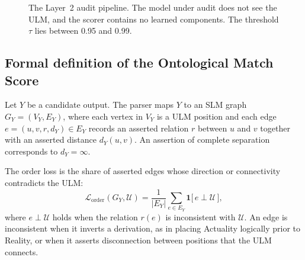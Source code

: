 \documentclass[twocolumn]{ulpaper}
\newcommand{\ULM}{\mathcal{U}}
\newcommand{\OMS}{\operatorname{OMS}}
\newcommand{\Lord}{\mathcal{L}_{\text{order}}}
\begin{document}
\begin{figure}[t]
\centering
{}
\caption{The Layer~2 audit pipeline. The model under audit does not see the ULM, and the scorer contains no learned components. The threshold $\tau$ lies between 0.95 and 0.99.}
\label{fig:pipeline}
\end{figure}

\subsection{Formal definition of the Ontological Match Score}

Let $Y$ be a candidate output. The parser maps $Y$ to an SLM graph $G_Y = (V_Y, E_Y)$, where each vertex in $V_Y$ is a ULM position and each edge $e = (u, v, r, d_Y) \in E_Y$ records an asserted relation $r$ between $u$ and $v$ together with an asserted distance $d_Y(u,v)$. An assertion of complete separation corresponds to $d_Y = \infty$.

\begin{definition}
The order loss is the share of asserted edges whose direction or connectivity contradicts the ULM:
\begin{equation}
\label{eq:lorder}
\Lord(G_Y, \ULM) = \frac{1}{\lvert E_Y \rvert} \sum_{e \in E_Y} \mathbf{1}\bigl[\, e \perp \ULM \,\bigr],
\end{equation}
\noindent where $e \perp \ULM$ holds when the relation $r(e)$ is inconsistent with $\ULM$. An edge is inconsistent when it inverts a derivation, as in placing Actuality logically prior to Reality, or when it asserts disconnection between positions that the ULM connects.
\end{definition}
\end{document}
